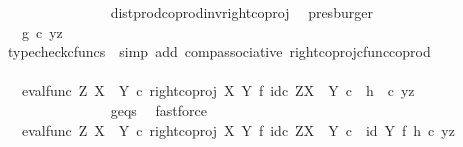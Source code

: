 \begin{isabellebody}
\ \ \ \ \ \ \ \ \ \ \ \ \ \ \isamarkupfalse%
\ dist{\isacharunderscore}{\kern0pt}prod{\isacharunderscore}{\kern0pt}coprod{\isacharunderscore}{\kern0pt}inv{}{\isacharunderscore}{\kern0pt}right{\isacharunderscore}{\kern0pt}coproj\ \isamarkupfalse%
\ presburger\isanewline
\ \ \ \ \ \ \ \ \ \ \ \ \isamarkupfalse%
\ \isamarkupfalse%
\ {\isachardoublequoteopen}{\isachardot}{\kern0pt}{\isachardot}{\kern0pt}{\isachardot}{\kern0pt}\ {\isacharequal}{\kern0pt}\ g\isactrlsup {\isasymflat}\ {\isasymcirc}\isactrlsub c\ {\isasymlangle}y{\isacharcomma}{\kern0pt}z{\isasymrangle}{\isachardoublequoteclose}\isanewline
\ \ \ \ \ \ \ \ \ \ \ \ \ \ \isamarkupfalse%
\ {\isacharparenleft}{\kern0pt}typecheck{\isacharunderscore}{\kern0pt}cfuncs{\isacharcomma}{\kern0pt}\ \ simp\ add{\isacharcolon}{\kern0pt}\ comp{\isacharunderscore}{\kern0pt}associative{}\ right{\isacharunderscore}{\kern0pt}coproj{\isacharunderscore}{\kern0pt}cfunc{\isacharunderscore}{\kern0pt}coprod{\isacharparenright}{\kern0pt}\isanewline
\ \ \ \ \ \ \ \ \ \ \ \ \isamarkupfalse%
\ \isamarkupfalse%
\ {\isachardoublequoteopen}{\isachardot}{\kern0pt}{\isachardot}{\kern0pt}{\isachardot}{\kern0pt}\ {\isacharequal}{\kern0pt}\ {\isacharparenleft}{\kern0pt}{\isacharparenleft}{\kern0pt}eval{\isacharunderscore}{\kern0pt}func\ Z\ {\isacharparenleft}{\kern0pt}X\ {\isasymCoprod}\ Y{\isacharparenright}{\kern0pt}\ {\isasymcirc}\isactrlsub c\ right{\isacharunderscore}{\kern0pt}coproj\ X\ Y\ {\isasymtimes}\isactrlsub f\ id\isactrlsub c\ {\isacharparenleft}{\kern0pt}Z\isactrlbsup {\isacharparenleft}{\kern0pt}X\ {\isasymCoprod}\ Y{\isacharparenright}{\kern0pt}\isactrlesup {\isacharparenright}{\kern0pt}{\isacharparenright}{\kern0pt}\isactrlsup {\isasymsharp}\ {\isasymcirc}\isactrlsub c\ \ h{\isacharparenright}{\kern0pt}\isactrlsup {\isasymflat}\ \ {\isasymcirc}\isactrlsub c\ {\isasymlangle}y{\isacharcomma}{\kern0pt}z{\isasymrangle}{\isachardoublequoteclose}\isanewline
\ \ \ \ \ \ \ \ \ \ \ \ \ \ \isamarkupfalse%
\ g{\isacharunderscore}{\kern0pt}eqs\ \isamarkupfalse%
\ fastforce\isanewline
\ \ \ \ \ \ \ \ \ \ \ \ \isamarkupfalse%
\ \isamarkupfalse%
\ {\isachardoublequoteopen}{\isachardot}{\kern0pt}{\isachardot}{\kern0pt}{\isachardot}{\kern0pt}\ {\isacharequal}{\kern0pt}\ {\isacharparenleft}{\kern0pt}{\isacharparenleft}{\kern0pt}{\isacharparenleft}{\kern0pt}eval{\isacharunderscore}{\kern0pt}func\ Z\ {\isacharparenleft}{\kern0pt}X\ {\isasymCoprod}\ Y{\isacharparenright}{\kern0pt}\ {\isasymcirc}\isactrlsub c\ right{\isacharunderscore}{\kern0pt}coproj\ X\ Y\ {\isasymtimes}\isactrlsub f\ id\isactrlsub c\ {\isacharparenleft}{\kern0pt}Z\isactrlbsup {\isacharparenleft}{\kern0pt}X\ {\isasymCoprod}\ Y{\isacharparenright}{\kern0pt}\isactrlesup {\isacharparenright}{\kern0pt}{\isacharparenright}{\kern0pt}\isactrlsup {\isasymsharp}\isactrlsup {\isasymflat}{\isacharparenright}{\kern0pt}\ {\isasymcirc}\isactrlsub c\ \ {\isacharparenleft}{\kern0pt}id\ Y\ {\isasymtimes}\isactrlsub f\ h{\isacharparenright}{\kern0pt}{\isacharparenright}{\kern0pt}\ {\isasymcirc}\isactrlsub c\ {\isasymlangle}y{\isacharcomma}{\kern0pt}z{\isasymrangle}{\isachardoublequoteclose}\isanewline

\end{isabellebody}
